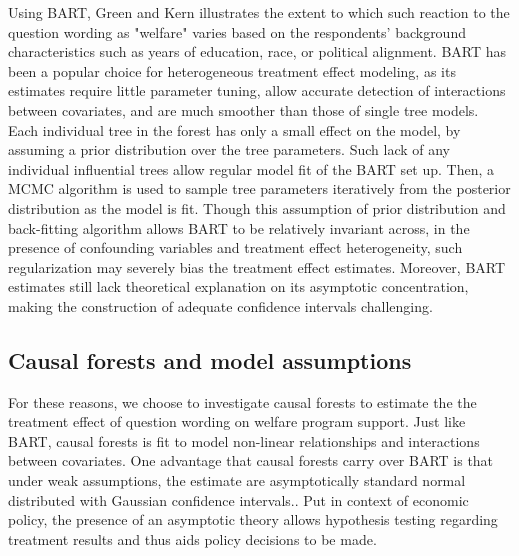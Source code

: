 \documentclass[12pt]{article}
\begin{document}
Using BART, Green and Kern illustrates the extent to which such reaction to the question wording as "welfare" varies based on the respondents' background characteristics such as years of education, race, or political alignment. BART has been a popular choice for heterogeneous treatment effect modeling, as its estimates require little parameter tuning, allow accurate detection of interactions between covariates, and are much smoother than those of single tree models. Each individual tree in the forest has only a small effect on the model, by assuming a prior distribution over the tree parameters.\cite{Chipman2010} Such lack of any individual influential trees allow regular model fit of the BART set up. Then, a MCMC algorithm is used to sample tree parameters iteratively from the posterior distribution as the model is fit. Though this assumption of prior distribution and back-fitting algorithm allows BART to be relatively invariant across, in the presence of confounding variables and treatment effect heterogeneity, such regularization may severely bias the treatment effect estimates.\cite{CarvalhoHahnMurray} Moreover, BART estimates still lack theoretical explanation on its asymptotic concentration, making the construction of adequate confidence intervals challenging. 

\subsection{Causal forests and model assumptions} 
For these reasons, we choose to investigate causal forests to estimate the the treatment effect of question wording on welfare program support. Just like BART, causal forests is fit to model non-linear relationships and interactions between covariates. One advantage that causal forests carry over BART is that under weak assumptions, the estimate are asymptotically standard normal distributed with Gaussian confidence intervals.\cite{atheywager2019}. Put in context of economic policy, the presence of an asymptotic theory allows hypothesis testing regarding treatment results and thus aids policy decisions to be made. \\
\end{document}
